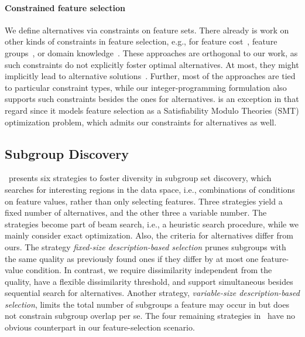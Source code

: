 \documentclass{article}
\theoremstyle{definition}
\begin{document}
\paragraph{Constrained feature selection}

We define alternatives via constraints on feature sets.
There already is work on other kinds of constraints in feature selection, e.g., for feature cost~\cite{paclik2002feature}, feature groups~\cite{yuan2006model}, or domain knowledge~\cite{bach2022empirical, groves2015toward}.
These approaches are orthogonal to our work, as such constraints do not explicitly foster optimal alternatives.
At most, they might implicitly lead to alternative solutions~\cite{bach2022empirical}.
Further, most of the approaches are tied to particular constraint types, while our integer-programming formulation also supports such constraints besides the ones for alternatives.
\cite{bach2022empirical} is an exception in that regard since it models feature selection as a Satisfiability Modulo Theories (\textsc{SMT}) optimization problem, which admits our constraints for alternatives as well.

\subsection{Subgroup Discovery}
\label{sec:afs:related-work:subgroup-discovery}

\cite{leeuwen2012diverse}~presents six strategies to foster diversity in subgroup set discovery, which searches for interesting regions in the data space, i.e., combinations of conditions on feature values, rather than only selecting features.
Three strategies yield a fixed number of alternatives, and the other three a variable number.
The strategies become part of beam search, i.e., a heuristic search procedure, while we mainly consider exact optimization.
Also, the criteria for alternatives differ from ours.
The strategy \emph{fixed-size description-based selection} prunes subgroups with the same quality as previously found ones if they differ by at most one feature-value condition.
In contrast, we require dissimilarity independent from the quality, have a flexible dissimilarity threshold, and support simultaneous besides sequential search for alternatives.
Another strategy, \emph{variable-size description-based selection}, limits the total number of subgroups a feature may occur in but does not constrain subgroup overlap per se.
The four remaining strategies in~\cite{leeuwen2012diverse} have no obvious counterpart in our feature-selection scenario.
\end{document}
